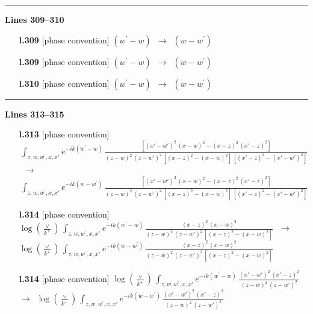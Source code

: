 \documentclass[10pt]{article}
\begin{document}
\noindent\rule{\linewidth}{0.3pt}\par\noindent\textbf{Lines 309--310} \par
\begin{itemize}[leftmargin=2.2em,itemsep=1pt,topsep=2pt]
\item[\textbf{l.309}] \textsf{\small [phase convention]} $\displaystyle (w^{\prime}-w)$\ $\longrightarrow$\ $\displaystyle (w-w^{\prime})$
\item[\textbf{l.309}] \textsf{\small [phase convention]} $\displaystyle (w^{\prime}-w)$\ $\longrightarrow$\ $\displaystyle (w-w^{\prime})$
\item[\textbf{l.310}] \textsf{\small [phase convention]} $\displaystyle (w^{\prime}-w)$\ $\longrightarrow$\ $\displaystyle (w-w^{\prime})$
\end{itemize}
\noindent\rule{\linewidth}{0.3pt}\par\noindent\textbf{Lines 313--315} \par
\begin{itemize}[leftmargin=2.2em,itemsep=1pt,topsep=2pt]
\item[\textbf{l.313}] \textsf{\small [phase convention]} $\displaystyle \,\int_{z,w,w^{\prime},x,x'} e^{-ik(w^{\prime}-w)}\,\frac{[(x'-w')^{2}\, (x-w)^{2} - (x-z)^{2}\, (x'-z)^{2}]}{(z-w)^{2}\, (z-w')^{2}\,[(x-z)^{2} - (x-w)^{2}]\, [(x'-z)^{2} - (x'-w')^{2}]}$\ $\longrightarrow$\ $\displaystyle \,\int_{z,w,w^{\prime},x,x'} e^{-ik(w-w^{\prime})}\,\frac{[(x'-w')^{2}\, (x-w)^{2} - (x-z)^{2}\, (x'-z)^{2}]}{(z-w)^{2}\, (z-w')^{2}\,[(x-z)^{2} - (x-w)^{2}]\, [(x'-z)^{2} - (x'-w')^{2}]}$
\item[\textbf{l.314}] \textsf{\small [phase convention]} $\displaystyle \log{(\frac{\vee}{k^{+}})}\,\int_{z,w,w^{\prime},x,x'} e^{-ik(w^{\prime}-w)}\,\frac{(x-z)^{2}\, (x-w)^{2}}{(z-w)^{2}\, (z-w')^{2}\,[(x-z)^{2} - (x-w)^{2}]}\,$\ $\longrightarrow$\ $\displaystyle \log{(\frac{\vee}{k^{+}})}\,\int_{z,w,w^{\prime},x,x'} e^{-ik(w-w^{\prime})}\,\frac{(x-z)^{2}\, (x-w)^{2}}{(z-w)^{2}\, (z-w')^{2}\,[(x-z)^{2} - (x-w)^{2}]}\,$
\item[\textbf{l.314}] \textsf{\small [phase convention]} $\displaystyle \log{(\frac{\vee}{k^{+}})}\,\int_{z,w,w^{\prime},x,x'} e^{-ik(w^{\prime}-w)}\,\frac{(x'-w')^{2}\, (x'-z)^{2}}{(z-w)^{2}\, (z-w')^{2}}$\ $\longrightarrow$\ $\displaystyle \log{(\frac{\vee}{k^{+}})}\,\int_{z,w,w^{\prime},x,x'} e^{-ik(w-w^{\prime})}\,\frac{(x'-w')^{2}\, (x'-z)^{2}}{(z-w)^{2}\, (z-w')^{2}}$
\end{itemize}
\end{document}
